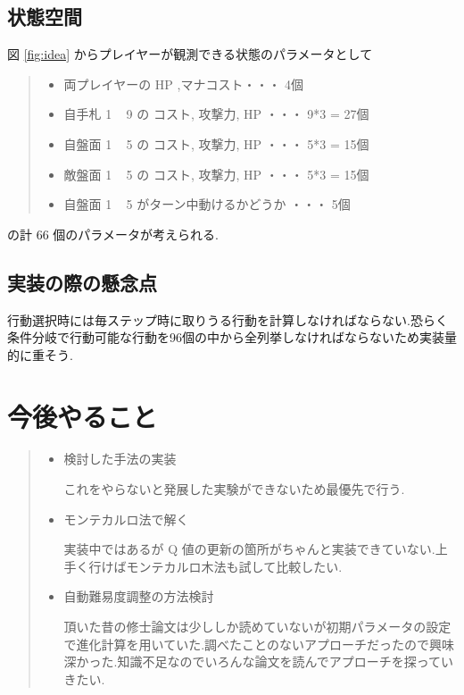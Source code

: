 \documentclass{jarticle}     %
\begin{document}
\subsection{状態空間}
図 \ref{fig:idea} からプレイヤーが観測できる状態のパラメータとして
\begin{quote}
  \begin{itemize}
   \item 両プレイヤーの HP ,マナコスト・・・ 4個
   \item 自手札 1 ~ 9 の コスト, 攻撃力, HP ・・・ 9*3 = 27個
   \item 自盤面 1 ~ 5 の コスト, 攻撃力, HP ・・・ 5*3 = 15個
   \item 敵盤面 1 ~ 5 の コスト, 攻撃力, HP ・・・ 5*3 = 15個
   \item 自盤面 1 ~ 5 がターン中動けるかどうか ・・・ 5個
  \end{itemize}
 \end{quote}
の計 66 個のパラメータが考えられる.

\subsection{実装の際の懸念点}
行動選択時には毎ステップ時に取りうる行動を計算しなければならない.恐らく条件分岐で行動可能な行動を96個の中から全列挙しなければならないため実装量的に重そう.

\section{今後やること}


\begin{quote}
  \begin{itemize}
   \item 検討した手法の実装
   \par
    これをやらないと発展した実験ができないため最優先で行う.
    \item モンテカルロ法で解く
    \par
    実装中ではあるが Q 値の更新の箇所がちゃんと実装できていない.上手く行けばモンテカルロ木法も試して比較したい.
    \item 自動難易度調整の方法検討
    \par
    頂いた昔の修士論文は少ししか読めていないが初期パラメータの設定で進化計算を用いていた.調べたことのないアプローチだったので興味深かった.知識不足なのでいろんな論文を読んでアプローチを探っていきたい.

  \end{itemize}
 \end{quote}



%
%
\end{document}
